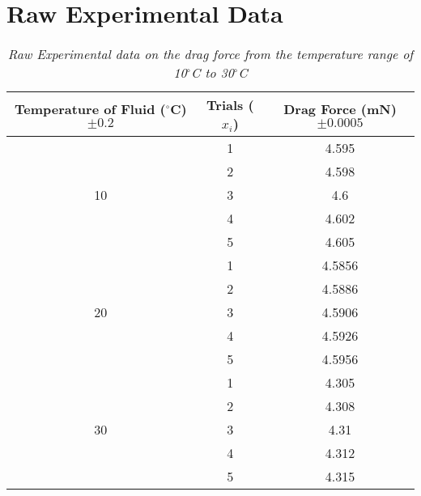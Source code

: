 \section{Raw Experimental Data}\label{rawexp mod1}

\begin{table}[H]
  \centering
  \caption{\textit{Raw Experimental data on the drag force from the temperature range of 10$^\circ$C to 30$^\circ$C}}
    \begin{tabular}{ccc}
    \toprule
    Temperature of Fluid ($^\circ$C) $\pm 0.2$ & Trials ($x_i$) & Drag Force (mN) $\pm 0.0005$ \\
    \midrule
    \multirow{5}[10]{*}{10} & 1     & 4.595 \\
\cmidrule{2-3}          & 2     & 4.598 \\
\cmidrule{2-3}          & 3     & 4.6 \\
\cmidrule{2-3}          & 4     & 4.602 \\
\cmidrule{2-3}          & 5     & 4.605 \\
    \midrule
    \multirow{5}[10]{*}{20} & 1     & 4.5856 \\
\cmidrule{2-3}          & 2     & 4.5886 \\
\cmidrule{2-3}          & 3     & 4.5906 \\
\cmidrule{2-3}          & 4     & 4.5926 \\
\cmidrule{2-3}          & 5     & 4.5956 \\
    \midrule
    \multirow{5}[10]{*}{30} & 1     & 4.305 \\
\cmidrule{2-3}          & 2     & 4.308 \\
\cmidrule{2-3}          & 3     & 4.31 \\
\cmidrule{2-3}          & 4     & 4.312 \\
\cmidrule{2-3}          & 5     & 4.315 \\
    \bottomrule
    \end{tabular}%
  \label{tab:addlabel}%
\end{table}%


